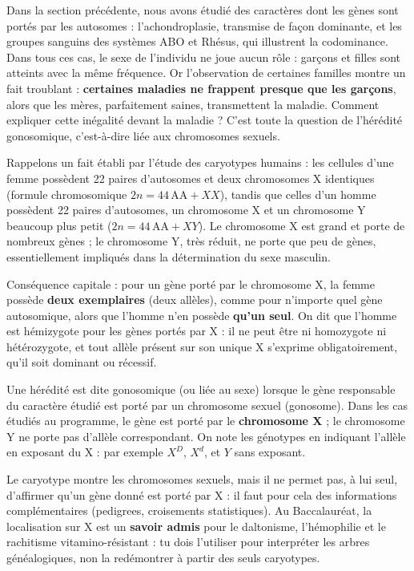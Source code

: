\documentclass[11pt]{article}
\newcommand{\cle}[1]{{\popxbold\color{popdark}#1}}
\newcounter{popsec}
\newcounter{popsub}
\newcommand{\courssub}[1]{%
  \stepcounter{popsub}%
  \par\vspace{9pt}\noindent{\popxbold\fontsize{11.5}{13}\selectfont\color{popink}{\color{poporange}\thepopsec.\thepopsub}\hspace{6pt}#1}\par\nopagebreak\vspace{4pt}
}
\begin{document}
Dans la section précédente, nous avons étudié des caractères dont les gènes sont portés par les \cle{autosomes} : l'achondroplasie, transmise de façon dominante, et les groupes sanguins des systèmes ABO et Rhésus, qui illustrent la codominance. Dans tous ces cas, le sexe de l'individu ne joue aucun rôle : garçons et filles sont atteints avec la même fréquence. Or l'observation de certaines familles montre un fait troublant : \textbf{certaines maladies ne frappent presque que les garçons}, alors que les mères, parfaitement saines, transmettent la maladie. Comment expliquer cette inégalité devant la maladie ? C'est toute la question de l'\cle{hérédité gonosomique}, c'est-à-dire liée aux chromosomes sexuels.

\courssub{Les gonosomes X et Y : un support inégal entre les sexes}

Rappelons un fait établi par l'étude des \cle{caryotypes} humains : les cellules d'une femme possèdent 22 paires d'autosomes et deux chromosomes X identiques (formule chromosomique $2n = 44\,\text{AA} + XX$), tandis que celles d'un homme possèdent 22 paires d'autosomes, un chromosome X et un chromosome Y beaucoup plus petit ($2n = 44\,\text{AA} + XY$). Le chromosome X est grand et porte de nombreux gènes ; le chromosome Y, très réduit, ne porte que peu de gènes, essentiellement impliqués dans la détermination du sexe masculin.

Conséquence capitale : pour un gène porté par le chromosome X, la femme possède \textbf{deux exemplaires} (deux allèles), comme pour n'importe quel gène autosomique, alors que l'homme n'en possède \textbf{qu'un seul}. On dit que l'homme est \cle{hémizygote} pour les gènes portés par X : il ne peut être ni homozygote ni hétérozygote, et tout allèle présent sur son unique X s'exprime obligatoirement, qu'il soit dominant ou récessif.

\begin{definition}
Une hérédité est dite \cle{gonosomique} (ou liée au sexe) lorsque le gène responsable du caractère étudié est porté par un chromosome sexuel (gonosome). Dans les cas étudiés au programme, le gène est porté par le \textbf{chromosome X} ; le chromosome Y ne porte pas d'allèle correspondant. On note les génotypes en indiquant l'allèle en exposant du X : par exemple $X^{D}$, $X^{d}$, et $Y$ sans exposant.
\end{definition}

\begin{attention}
Le caryotype montre les chromosomes sexuels, mais il ne permet pas, à lui seul, d'affirmer qu'un gène donné est porté par X : il faut pour cela des informations complémentaires (pedigrees, croisements statistiques). Au Baccalauréat, la localisation sur X est un \textbf{savoir admis} pour le daltonisme, l'hémophilie et le rachitisme vitamino-résistant : tu dois l'utiliser pour interpréter les arbres généalogiques, non la redémontrer à partir des seuls caryotypes.
\end{attention}
\end{document}

